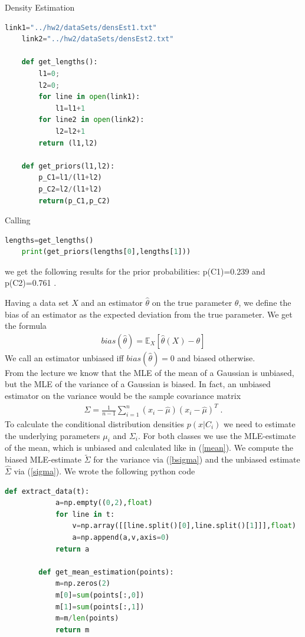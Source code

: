 \documentclass[
ngerman,
]{tudaexercise}
\newcommand{\sni}{\sum_{i=1}^{n}}
\begin{document}
\begin{task}{Density Estimation}
\begin{subtask}
\begin{lstlisting}[language=Python]
	link1="../hw2/dataSets/densEst1.txt"
	link2="../hw2/dataSets/densEst2.txt"
	
	def get_lengths():
		l1=0;
		l2=0;
		for line in open(link1):
			l1=l1+1
		for line2 in open(link2):
			l2=l2+1
		return (l1,l2)    
	
	def get_priors(l1,l2):
		p_C1=l1/(l1+l2)
		p_C2=l2/(l1+l2)
		return(p_C1,p_C2)
		\end{lstlisting}
		Calling
		\begin{lstlisting}[language=Python]
	lengths=get_lengths()
	print(get_priors(lengths[0],lengths[1]))
		\end{lstlisting}
		we get the following results for the prior probabilities: p(C1)=0.239 and p(C2)=0.761 .
		\end{subtask}
	\begin{subtask}
		Having a data set $X$ and an estimator $\hat{\theta}$ on the true parameter $\theta$, we define the bias of an estimator as the expected deviation from the true parameter. We get the formula\begin{align*}bias(\hat{\theta})=\mathbb{E}_X\left[ \hat{\theta}(X)-\theta\right] 
		\end{align*} We call an estimator unbiased iff $bias(\hat{\theta})=0$ and biased otherwise.\\From the lecture we know that the MLE of the mean of a Gaussian is unbiased, but the MLE of the variance of a Gaussian is biased. In fact, an unbiased estimator on the variance would be the sample covariance matrix \begin{align}\label{sigma}
\hat{\Sigma}=\frac{1}{n-1}\sni(x_i-\hat{\mu})(x_i-\hat{\mu})^T \;.
		\end{align}
		To calculate the conditional distribution densities $p(x|C_i)$ we need to estimate the underlying parameters $\mu_i$ and $\Sigma_i$. For both classes we use the MLE-estimate of the mean, which is unbiased and calculated like in (\ref{mean}). We compute the biased MLE-estimate $\tilde{\Sigma}$ for the variance via (\ref{bsigma}) and the unbiased estimate $\hat{\Sigma}$ via (\ref{sigma}). We wrote the following python code
		\begin{lstlisting}[language=Python]
		def extract_data(t):
			a=np.empty((0,2),float)
			for line in t:
				v=np.array([[line.split()[0],line.split()[1]]],float)
				a=np.append(a,v,axis=0)
			return a
		
		def get_mean_estimation(points):
			m=np.zeros(2)
			m[0]=sum(points[:,0])
			m[1]=sum(points[:,1])
			m=m/len(points)
			return m
		

\end{lstlisting}
\end{subtask}
\end{task}
\end{document}
